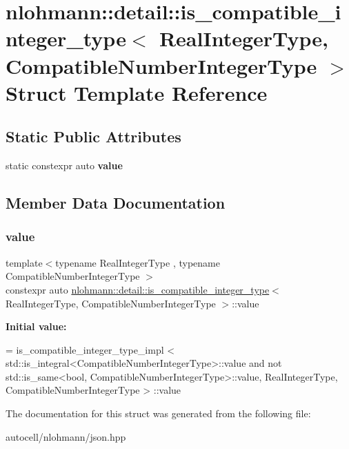 \hypertarget{structnlohmann_1_1detail_1_1is__compatible__integer__type}{}\section{nlohmann\+:\+:detail\+:\+:is\+\_\+compatible\+\_\+integer\+\_\+type$<$ Real\+Integer\+Type, Compatible\+Number\+Integer\+Type $>$ Struct Template Reference}
\label{structnlohmann_1_1detail_1_1is__compatible__integer__type}
\subsection*{Static Public Attributes}
\begin{DoxyCompactItemize}
\item 
static constexpr auto {\bfseries value}
\end{DoxyCompactItemize}


\subsection{Member Data Documentation}
\mbox{\label{structnlohmann_1_1detail_1_1is__compatible__integer__type_ac5e5bd39773676564c73d3dd2a9c6e0a}} 
\subsubsection{\texorpdfstring{value}{value}}
{\footnotesize\ttfamily template$<$typename Real\+Integer\+Type , typename Compatible\+Number\+Integer\+Type $>$ \\
constexpr auto \mbox{\hyperlink{structnlohmann_1_1detail_1_1is__compatible__integer__type}{nlohmann\+::detail\+::is\+\_\+compatible\+\_\+integer\+\_\+type}}$<$ Real\+Integer\+Type, Compatible\+Number\+Integer\+Type $>$\+::value\hspace{0.3cm}{\ttfamily [static]}}

{\bfseries Initial value\+:}
\begin{DoxyCode}
=
        is\_compatible\_integer\_type\_impl <
        std::is\_integral<CompatibleNumberIntegerType>::value and
        not std::is\_same<bool, CompatibleNumberIntegerType>::value,
        RealIntegerType, CompatibleNumberIntegerType > ::value
\end{DoxyCode}


The documentation for this struct was generated from the following file\+:\begin{DoxyCompactItemize}
\item 
autocell/nlohmann/json.\+hpp\end{DoxyCompactItemize}
